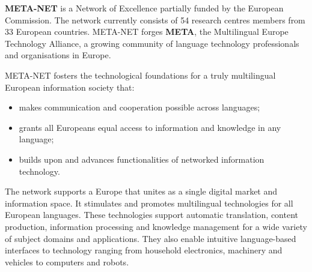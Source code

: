 {\bf META-NET} is a Network of Excellence partially funded by the European Commission. The network currently consists of 54 research centres members from 33 European countries. META-NET forges {\bf META}, the Multilingual Europe Technology Alliance, a growing community of language technology professionals and organisations in Europe. 


META-NET fosters the technological foundations for a truly multilingual European information society that:

\begin{itemize}
\item makes communication and cooperation possible across languages;
\item grants all Europeans equal access to information and knowledge in any language;
\item builds upon and advances functionalities of networked information technology.
\end{itemize}

The network supports a Europe that unites as a single digital market and information space. It stimulates and promotes multilingual technologies for all European languages. These technologies support automatic translation, content production, information processing and knowledge management for a wide variety of subject domains and applications. They also enable intuitive language-based interfaces to technology ranging from household electronics, machinery and vehicles to computers and robots. 
